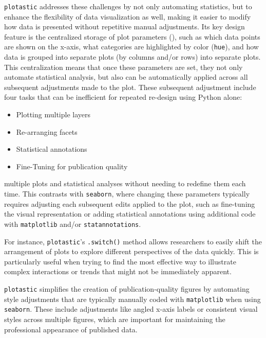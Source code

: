 \texttt{plotastic} addresses these challenges by not only automating statistics,
but to enhance the flexibility of data visualization as well, making it easier
to modify how data is presented without repetitive manual adjustments. Its key
design feature is the centralized storage of plot parameters (\plotparams), such as which data
points are shown on the x-axis, what categories are highlighted by color (\texttt{hue}),
and how data is grouped into separate plots (by columns and/or rows) into
separate plots. This centralization means that once these parameters are set,
they not only automate statistical analysis, but also can be automatically
applied across all subsequent adjustments made to the plot. These subsequent
adjustment include four tasks that can be inefficient for repeated re-design
using Python alone:
\begin{itemize}
    \item {Plotting multiple layers}
    \item {Re-arranging facets}
    \item {Statistical annotations}
    \item {Fine-Tuning for publication quality}
\end{itemize}

multiple plots and statistical analyses
without needing to redefine them each time. This contrasts with
\texttt{seaborn}, where changing these parameters typically requires adjusting
each subsequent edits applied to the plot, such as fine-tuning the visual
representation or adding statistical annotations using additional code with
\texttt{matplotlib} and/or \texttt{statannotations}.

For instance, \texttt{plotastic}'s \texttt{.switch()} method allows researchers
to easily shift the arrangement of plots  to explore
different perspectives of the data quickly. This is particularly useful when
trying to find the most effective way to illustrate complex interactions or
trends that might not be immediately apparent.

\texttt{plotastic} simplifies the creation of publication-quality
figures by automating style adjustments that are typically manually coded with
\texttt{matplotlib} when using \texttt{seaborn}. These include adjustments like
angled x-axis labels or consistent visual styles across multiple figures, which
are important for maintaining the professional appearance of published data.


